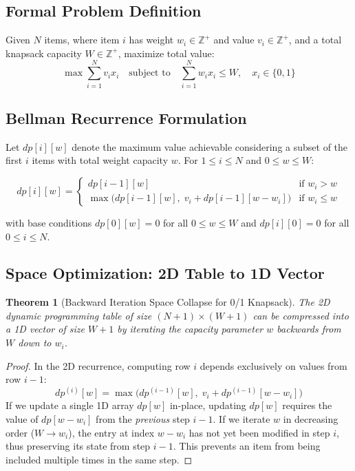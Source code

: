 \documentclass[10pt,journal,compsoc,onecolumn]{IEEEtran}
\newtheorem{theorem}{Theorem}
\begin{document}
\subsection{Formal Problem Definition}

Given $N$ items, where item $i$ has weight $w_i \in \mathbb{Z}^+$ and value $v_i \in \mathbb{Z}^+$, and a total knapsack capacity $W \in \mathbb{Z}^+$, maximize total value:
\[
\max \sum_{i=1}^{N} v_i x_i \quad \text{subject to} \quad \sum_{i=1}^{N} w_i x_i \le W, \quad x_i \in \{0, 1\}
\]

\subsection{Bellman Recurrence Formulation}

Let $dp[i][w]$ denote the maximum value achievable considering a subset of the first $i$ items with total weight capacity $w$. For $1 \le i \le N$ and $0 \le w \le W$:

\[
dp[i][w] = 
\begin{cases}
dp[i-1][w] & \text{if } w_i > w \\
\max\Big(dp[i-1][w], \; v_i + dp[i-1][w - w_i]\Big) & \text{if } w_i \le w
\end{cases}
\]

with base conditions $dp[0][w] = 0$ for all $0 \le w \le W$ and $dp[i][0] = 0$ for all $0 \le i \le N$.

\subsection{Space Optimization: 2D Table to 1D Vector}

\begin{theorem}[Backward Iteration Space Collapse for 0/1 Knapsack]
The 2D dynamic programming table of size $(N+1) \times (W+1)$ can be compressed into a 1D vector of size $W+1$ by iterating the capacity parameter $w$ backwards from $W$ down to $w_i$.
\end{theorem}

\begin{proof}
In the 2D recurrence, computing row $i$ depends exclusively on values from row $i-1$:
\[
dp^{(i)}[w] = \max\Big(dp^{(i-1)}[w], \; v_i + dp^{(i-1)}[w - w_i]\Big)
\]
If we update a single 1D array $dp[w]$ in-place, updating $dp[w]$ requires the value of $dp[w - w_i]$ from the \emph{previous} step $i-1$. If we iterate $w$ in decreasing order ($W \to w_i$), the entry at index $w - w_i$ has not yet been modified in step $i$, thus preserving its state from step $i-1$. This prevents an item from being included multiple times in the same step.
\end{proof}
\end{document}

